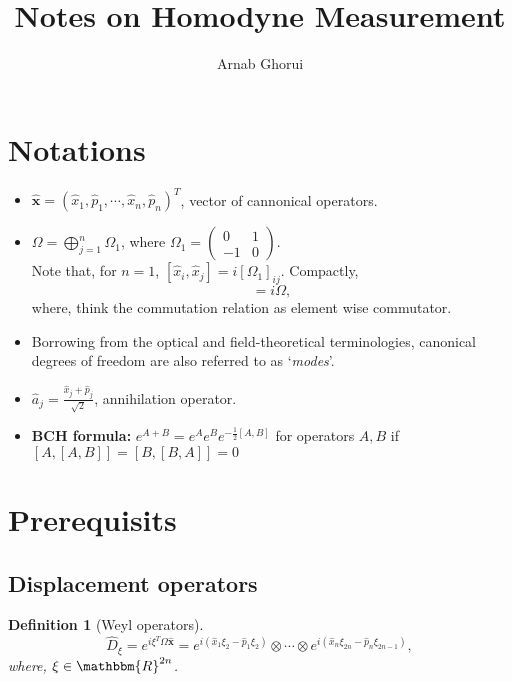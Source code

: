 \documentclass[english,10pt,a4paper]{article}
\title{Notes on Homodyne Measurement}
\author{Arnab Ghorui}
\newtheorem{definition}{Definition}
\newcommand{\xx}{\hat{\textbf{x}}}
\newcommand{\dd}[1]{\hat{D}_{#1}}
\newcommand{\half}{\frac{1}{2}}
\begin{document}
	\maketitle
	
	\section{Notations}
	\begin{itemize}
		\item $\xx= (\hat x_1, \hat p_1,\cdots,\hat x_n, \hat p_n)^T$, vector of cannonical operators.
		\item $\Omega = \bigoplus_{j=1}^n \Omega_1$, where $\Omega_1 = \begin{pmatrix}
			0 & 1 \\ -1 & 0
		\end{pmatrix}$.\\
		Note that, for $n=1$, $[\hat x_i,\hat x_j] = i[\Omega_1]_{ij}$. Compactly, 
		\begin{equation}
			[\xx, \xx^T] = i\Omega, \tag{Canonical Commutation Relation}
		\end{equation}
		 where, think the commutation relation as element wise commutator.
		\item Borrowing from the optical and field-theoretical terminologies, canonical degrees	of freedom are also referred to as ‘\textit{modes}’.
		\item $\hat a_j = \frac{\hat x_j + \hat p_j}{\sqrt 2}$, annihilation operator.
		\item \textbf{BCH formula: }$e^{A+B}=e^A e^B e^{-\half[A,B]}$	for operators $A,B$ if $[A,[A,B]]=[B,[B,A]]=0$
	\end{itemize}
	
	\section{Prerequisits}
	\subsection{Displacement operators}
	\begin{definition}[Weyl operators]
		\begin{equation}
			\dd{\xi} =e^{i \xi^T \Omega \xx} = e^{i(\hat{x}_1\xi_2-\hat{p}_1\xi_2)}\otimes\cdots\otimes e^{i(\hat{x}_n\xi_{2n}-\hat{p}_n\xi_{2n-1})},
		\end{equation}
		where, $\xi \in \mathbbm{R}^{2n}$.
	\end{definition}
	
\end{document}
